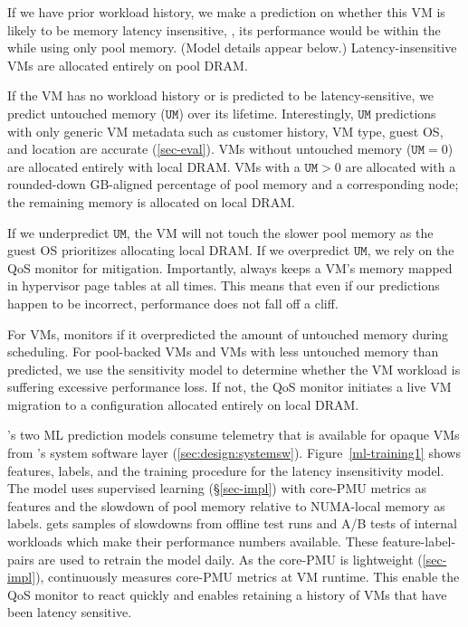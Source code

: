 {If we have prior workload history, we make a prediction on whether this
VM is likely to be memory latency insensitive, \ie, its performance would be
within the \pdm while using only pool memory. (Model details appear below.)
Latency-insensitive VMs are allocated entirely on pool DRAM.






If the VM has no workload history or is predicted to be latency-sensitive,
we predict untouched memory ($\texttt{UM}$) over its
lifetime.  Interestingly, $\texttt{UM}$ predictions with only generic VM metadata such as customer history, VM type, guest OS,
and location are accurate (\sec\ref{sec-eval}).  VMs without untouched memory ($\texttt{UM}=0$) are allocated
entirely with local DRAM.  VMs with a $\texttt{UM}>0$ are allocated with a rounded-down GB-aligned percentage of pool
memory and a corresponding \cvn node;
the remaining memory is allocated on local DRAM.

If we underpredict $\texttt{UM}$, the VM will not touch the slower pool
memory as the guest OS prioritizes allocating local DRAM.
If we overpredict $\texttt{UM}$, we rely on the QoS monitor for mitigation.
Importantly, \sys always keeps a VM's memory mapped in hypervisor page
tables at all times. This means that even if our predictions happen to
be incorrect, performance does not fall off a cliff.


For \cvn VMs, \sys monitors if it overpredicted
the amount of untouched memory during scheduling.
For pool-backed VMs and \cvn VMs with
less untouched memory than predicted, we use the sensitivity model to
determine whether the VM workload is suffering excessive performance loss.
If not, the QoS monitor initiates a live VM migration to a configuration
allocated entirely on local DRAM.

\sys's two ML prediction models consume telemetry that is available for opaque VMs from \sys's system software layer
(\sec\ref{sec:design:systemsw}).
Figure~\ref{ml-training1} shows features, labels, and the training procedure for the
latency insensitivity model.
The model uses supervised learning (\S\ref{sec-impl}) with core-PMU metrics as features
and the slowdown of pool memory relative to NUMA-local memory as labels.
\sys gets samples of slowdowns from offline test runs and A\slash B tests of internal
workloads which make their performance numbers available.
These feature-label-pairs are used to retrain the model daily.
As the core-PMU is lightweight (\sec\ref{sec-impl}),
\sys continuously measures core-PMU metrics at VM runtime.
This enable the QoS monitor to react quickly and enables retaining
a history of VMs that have been latency sensitive.

}

